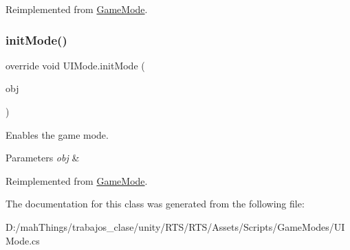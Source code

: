 Reimplemented from \mbox{\hyperlink{class_game_mode_a32a61bf0dfef83cfc1724b92f3d50cdf}{Game\+Mode}}.

\mbox{\label{class_u_i_mode_a97dcd9e20017c87075bcc9c1a560d8a8}} 
\subsubsection{\texorpdfstring{init\+Mode()}{initMode()}}
{\footnotesize\ttfamily override void U\+I\+Mode.\+init\+Mode (\begin{DoxyParamCaption}\item[{\mbox{\hyperlink{class_selectable_object}{Selectable\+Object}}}]{obj }\end{DoxyParamCaption})\hspace{0.3cm}{\ttfamily [virtual]}}



Enables the game mode. 


\begin{DoxyParams}{Parameters}
{\em obj} & \\
\hline
\end{DoxyParams}


Reimplemented from \mbox{\hyperlink{class_game_mode_ac6701d024e8ab5bf8a8876618a6fd01f}{Game\+Mode}}.



The documentation for this class was generated from the following file\+:\begin{DoxyCompactItemize}
\item 
D\+:/mah\+Things/trabajos\+\_\+clase/unity/\+R\+T\+S/\+R\+T\+S/\+Assets/\+Scripts/\+Game\+Modes/U\+I\+Mode.\+cs\end{DoxyCompactItemize}
